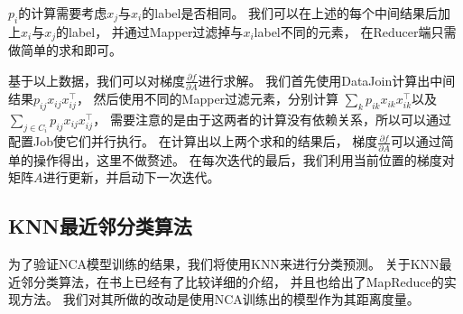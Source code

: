 \documentclass[a4paper,UTF8]{article}
\theoremstyle{definition}
\begin{document}
$p_i$的计算需要考虑$x_j$与$x_i$的label是否相同。
我们可以在上述的每个中间结果后加上$x_i$与$x_j$的label，
并通过Mapper过滤掉与$x_i$label不同的元素，
在Reducer端只需做简单的求和即可。

基于以上数据，我们可以对梯度$\frac{\partial f}{\partial A}$进行求解。
我们首先使用DataJoin计算出中间结果$p_{ij} x_{ij} x_{ij}^\top$，
然后使用不同的Mapper过滤元素，分别计算
$\sum_{k} p_{ik} x_{ik} x_{ik}^\top$以及$\sum_{j \in C_i} p_{ij} x_{ij} x_{ij}^\top$，
需要注意的是由于这两者的计算没有依赖关系，所以可以通过配置Job使它们并行执行。
在计算出以上两个求和的结果后，
梯度$\frac{\partial f}{\partial A}$可以通过简单的操作得出，这里不做赘述。
在每次迭代的最后，我们利用当前位置的梯度对矩阵$A$进行更新，并启动下一次迭代。

\subsection*{KNN最近邻分类算法}

为了验证NCA模型训练的结果，我们将使用KNN来进行分类预测。
关于KNN最近邻分类算法，在书上已经有了比较详细的介绍，
并且也给出了MapReduce的实现方法。
我们对其所做的改动是使用NCA训练出的模型作为其距离度量。

\nocite{*}

\end{document}

